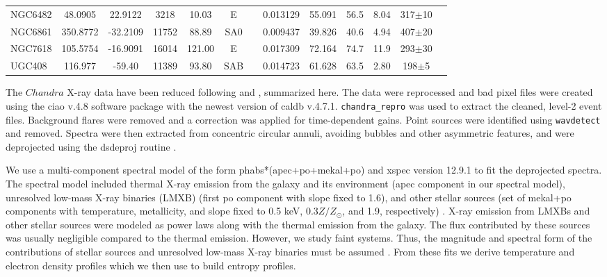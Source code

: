\documentclass[apjl]{emulateapj}
\begin{document}
\begin{table}
\begin{tabular}{lcccccccccccc}
NGC6482 & 48.0905 & 22.9122 & 3218 & 10.03 & E &            & 0.013129 & 55.091 & 56.5 & 8.04 & 317$\pm$10 \\
NGC6861 & 350.8772 & -32.2109 & 11752 & 88.89 & SA0 &        & 0.009437 & 39.826 & 40.6 & 4.94 & 407$\pm$20 \\
NGC7618 & 105.5754 & -16.9091 & 16014 & 121.00   & E &         & 0.017309 & 72.164 & 74.7  &  11.9 & 293$\pm$30 \\
UGC408  & 116.977 & -59.40 & 11389 & 93.80 & SAB & & 0.014723 & 61.628 & 63.5 & 2.80 & 198$\pm$5 \\
\hline
\end{tabular}
\end{table}

The $Chandra$ X-ray data have been reduced following \citet{Hogan:17a} and \citet{Pulido:17}, summarized here. The data were reprocessed and bad pixel files were created using the {\sc ciao v.4.8} software package with the newest version of {\sc caldb v.4.7.1}. \texttt{chandra\_repro} was used to extract the cleaned, level-2 event files. Background flares were removed and a correction was applied for time-dependent gains. Point sources were identified using \texttt{wavdetect} and removed. Spectra were then extracted from concentric circular annuli, avoiding bubbles and other asymmetric features, and were deprojected using the {\sc dsdeproj} routine \citep{Sanders:07, Russell:08}. 

We use a multi-component spectral model of the form {\sc phabs*(apec+po+mekal+po)} and {\sc xspec} version 12.9.1 \citep{Arnaud:96} to fit the deprojected spectra. The spectral model included  thermal X-ray emission from the galaxy and its environment ({\sc apec} component in our spectral model), unresolved low-mass X-ray binaries (LMXB) (first {\sc po} component with slope fixed to 1.6), and other stellar sources (set of {\sc mekal+po} components with temperature, metallicity, and slope fixed to 0.5 keV, 0.3$Z/Z_{\odot}$, and 1.9, respectively) \citep[see][for more details]{Babyk:17scal, Babyk:17prof}. X-ray emission from LMXBs and other stellar sources were modeled as power laws along with the thermal emission from the galaxy. The flux contributed by these sources was usually negligible compared to the thermal emission. However, we study faint systems. Thus, the magnitude and spectral form of the contributions of stellar sources and unresolved low-mass X-ray binaries must be assumed \citep{Boroson:10, Kim:13, Kim:15}. From these fits we derive temperature and electron density profiles which we then use to build entropy profiles.
\end{document}
